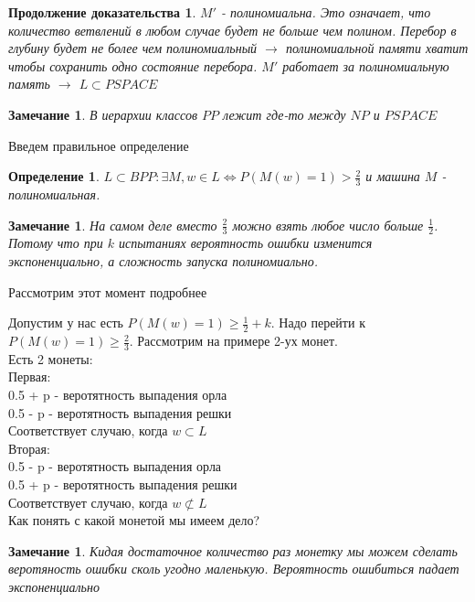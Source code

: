 \documentclass{beamer}
\theoremstyle{plain}
\newtheorem{rmk}[thm]{Замечание}
\newtheorem{proof-rus-cont}[thm]{Продолжение доказательства}
\newtheorem{dfn}[thm]{Определение}
\theoremstyle{definition}
\begin{document}
\begin{frame}
    \begin{proof-rus-cont}
    $M'$ - полиномиальна. Это означает, что количество ветвлений в любом случае будет не больше чем полином.
    Перебор в глубину будет не более чем полиномиальный $\rightarrow$ полиномиальной памяти хватит чтобы сохранить одно состояние перебора. $M'$ работает за полиномиальную память $\rightarrow$ $ L \subset PSPACE $
    \end{proof-rus-cont}
    \begin{rmk}
    В иерархии классов $PP$ лежит где-то между $NP$ и $PSPACE$
    \end{rmk}
\end{frame}

\begin{frame}
    Введем правильное определение
    \begin{dfn}
        $ L \subset BPP : \exists M, w \in L \Leftrightarrow P(M(w)=1)>\frac{2}{3}$ и машина $M$ - полиномиальная.
    \end{dfn}
    \begin{rmk}
        На самом деле вместо $\frac{2}{3}$ можно взять любое число больше $\frac{1}{2}$. Потому что при $k$ испытаниях вероятность ошибки изменится экспоненциально, а сложность запуска полиномиально.
    \end{rmk}
    Рассмотрим этот момент подробнее
\end{frame}

\begin{frame}
    Допустим у нас есть $P(M(w)=1) \geq  \frac{1}{2} + k$. Надо перейти к $P(M(w)=1) \geq \frac{2}{3}$. Рассмотрим на примере 2-ух монет. \\
    Есть 2 монеты: \\
    Первая: \\
        0.5 + p - веротятность выпадения орла \\
        0.5 - p - веротятность выпадения решки \\
    Соответствует случаю, когда $ w \subset L$ \\
    Вторая: \\
        0.5 - p - веротятность выпадения орла \\
        0.5 + p - веротятность выпадения решки \\
    Соответствует случаю, когда $ w \not\subset L$ \\
    Как понять с какой монетой мы имеем дело?
    \begin{rmk}
        Кидая достаточное количество раз монетку мы можем сделать веротяность ошибки сколь угодно маленькую. Вероятность ошибиться падает экспоненциально
    \end{rmk}
        
\end{frame}
\end{document}

